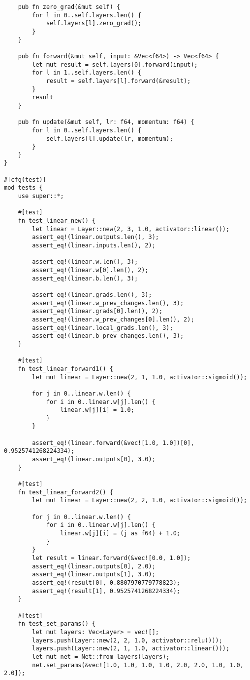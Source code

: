 \begin{code}
\begin{verbatim}
    pub fn zero_grad(&mut self) {
        for l in 0..self.layers.len() {
            self.layers[l].zero_grad();
        }
    }

    pub fn forward(&mut self, input: &Vec<f64>) -> Vec<f64> {
        let mut result = self.layers[0].forward(input);
        for l in 1..self.layers.len() {
            result = self.layers[l].forward(&result);
        }
        result
    }

    pub fn update(&mut self, lr: f64, momentum: f64) {
        for l in 0..self.layers.len() {
            self.layers[l].update(lr, momentum);
        }
    }
}

#[cfg(test)]
mod tests {
    use super::*;

    #[test]
    fn test_linear_new() {
        let linear = Layer::new(2, 3, 1.0, activator::linear());
        assert_eq!(linear.outputs.len(), 3);
        assert_eq!(linear.inputs.len(), 2);

        assert_eq!(linear.w.len(), 3);
        assert_eq!(linear.w[0].len(), 2);
        assert_eq!(linear.b.len(), 3);

        assert_eq!(linear.grads.len(), 3);
        assert_eq!(linear.w_prev_changes.len(), 3);
        assert_eq!(linear.grads[0].len(), 2);
        assert_eq!(linear.w_prev_changes[0].len(), 2);
        assert_eq!(linear.local_grads.len(), 3);
        assert_eq!(linear.b_prev_changes.len(), 3);
    }

    #[test]
    fn test_linear_forward1() {
        let mut linear = Layer::new(2, 1, 1.0, activator::sigmoid());

        for j in 0..linear.w.len() {
            for i in 0..linear.w[j].len() {
                linear.w[j][i] = 1.0;
            }
        }

        assert_eq!(linear.forward(&vec![1.0, 1.0])[0], 0.9525741268224334);
        assert_eq!(linear.outputs[0], 3.0);
    }

    #[test]
    fn test_linear_forward2() {
        let mut linear = Layer::new(2, 2, 1.0, activator::sigmoid());

        for j in 0..linear.w.len() {
            for i in 0..linear.w[j].len() {
                linear.w[j][i] = (j as f64) + 1.0;
            }
        }
        let result = linear.forward(&vec![0.0, 1.0]);
        assert_eq!(linear.outputs[0], 2.0);
        assert_eq!(linear.outputs[1], 3.0);
        assert_eq!(result[0], 0.8807970779778823);
        assert_eq!(result[1], 0.9525741268224334);
    }

    #[test]
    fn test_set_params() {
        let mut layers: Vec<Layer> = vec![];
        layers.push(Layer::new(2, 2, 1.0, activator::relu()));
        layers.push(Layer::new(2, 1, 1.0, activator::linear()));
        let mut net = Net::from_layers(layers);
        net.set_params(&vec![1.0, 1.0, 1.0, 1.0, 2.0, 2.0, 1.0, 1.0, 2.0]);


\end{verbatim}
\end{code}
